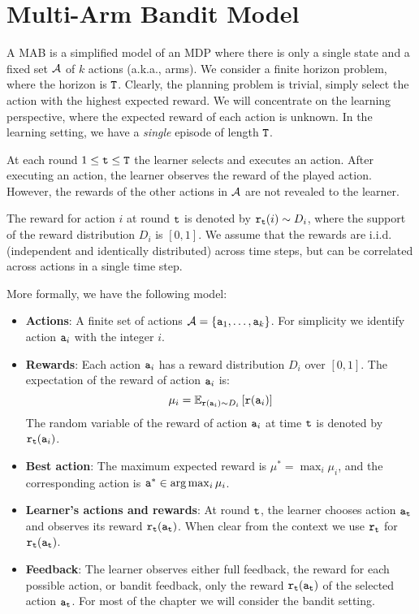 
\section{Multi-Arm Bandit Model}

A MAB is a simplified model of an MDP where there is only a
single state and a fixed set $\mathcal{A}$ of $k$ actions (a.k.a., arms). We consider a finite horizon problem, where the horizon is ${\tt T}$.
Clearly, the planning problem is trivial, simply select the action with the highest expected reward. We will concentrate on the learning perspective, where the expected reward of each action is unknown. In the learning setting, we  have a \emph{single} episode of length ${\tt T}$.

At each round $1\leq {\tt t}\leq {\tt T}$ the learner selects and executes an action. After executing an action, the learner observes the reward of the played action. However, the rewards of the other actions in $\mathcal{A}$ are not revealed to the learner.

The reward for action $i$ at round ${\tt t}$ is denoted by ${\tt r}_{{\tt t}}(i)\sim D_{i}$, where the support of the reward distribution $D_{i}$ is $[0,1]$. We assume that the rewards are i.i.d. (independent and identically distributed) across time steps, but can be correlated across actions in a single time step.

More formally, we have the following model:
\begin{itemize}
\item \textbf{Actions}: A finite set of actions $\mathcal{A}=\left\{ {\tt a}_{1},\dots,{\tt a}_{k}\right\} $. For simplicity we identify action ${\tt a}_i$ with the integer $i$.
\item \textbf{Rewards}: Each action ${\tt a}_{i}$ has a reward distribution $D_{i}$ over $[0,1]$. The expectation of the reward of action ${\tt a}_i$ is:
\[
\mu_{i}=\mathbb{E}_{{\tt r}({\tt a}_i)\sim D_{i}}\left[{\tt r}({\tt a}_i)\right]
\]
The random variable of the reward of action ${\tt a}_i$ at time ${\tt t}$ is denoted by ${\tt r}_{\tt t}({\tt a}_i)$.
\item \textbf{Best action}: The maximum expected reward is $\mu^{*}= \max_{i}\mu_{i}$, and the corresponding action is ${\tt a}^*\in \arg\max_i\mu_i$.
\item \textbf{Learner's actions and rewards}: At round ${\tt t}$, the learner chooses action ${\tt a}_{{\tt t}}$ and observes its reward ${\tt r}_{\tt t}({\tt a}_{\tt t})$. When clear from the context we use ${\tt r}_{\tt t}$ for ${\tt r}_{\tt t}({\tt a}_{\tt t})$.
\item \textbf{Feedback}: The learner observes either full feedback, the reward for each possible action, or bandit feedback, only the reward ${\tt r}_{\tt t}({\tt a}_{\tt t})$ of the selected action ${\tt a}_{\tt t}$. For most of the chapter we will consider the bandit setting.
\end{itemize}

